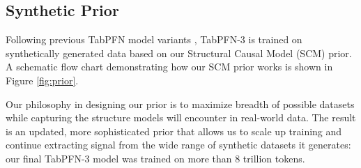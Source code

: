 \subsection{Synthetic Prior}\label{sec:synthetic-prior}
Following previous TabPFN model variants \cite{TabPFN-2.5, hollmann2022tabpfnv1, Hollmann2025tabpfnv2}, TabPFN-3 is trained on synthetically generated data based on our Structural Causal Model (SCM) prior. A schematic flow chart demonstrating how our SCM prior works is shown in Figure \ref{fig:prior}.

Our philosophy in designing our prior is to maximize breadth of possible datasets while capturing the structure models will encounter in real-world data. The result is an updated, more sophisticated prior that allows us to scale up training and continue extracting signal from the wide range of synthetic datasets it generates: our final TabPFN-3 model was trained on more than 8 trillion tokens.



